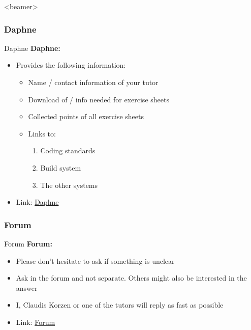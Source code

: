 \begin{frame}<beamer>{\LectureToC}
  \tableofcontents[currentsection, currentsubsection,
    subsubsectionstyle=show/show/shaded
  ]
\end{frame}

\subsubsection{Daphne}

\begin{frame}{Daphne}
  \textbf{Daphne:}
  \begin{itemize}
    \item
      Provides the following information:
      \begin{itemize}
        \item
          Name / contact information of your tutor
        \item
          Download of / info needed for exercise sheets
        \item
          Collected points of all exercise sheets
        \item
          Links to:
          \begin{enumerate}
            \item
              Coding standards
            \item
              Build system
            \item
              The other systems
          \end{enumerate}
      \end{itemize}
    \item
      Link: {\color{MainA}\href{\LectureDaphneLink}{Daphne}}
  \end{itemize}
\end{frame}


\subsubsection{Forum}
\begin{frame}{Forum}
  \textbf{Forum:}
  \begin{itemize}
    \item
      Please don't hesitate to ask if something is unclear
    \item
      Ask in the forum and not separate.
      Others might also be interested in the answer
    \item
      {\color{MainA}I}, {\color{MainA}Claudis Korzen} or one of the
      {\color{MainA}tutors} will reply as fast as possible
    \item
      Link: {\color{MainA}\href{\LectureForumLink}{Forum}}
  \end{itemize}
\end{frame}

